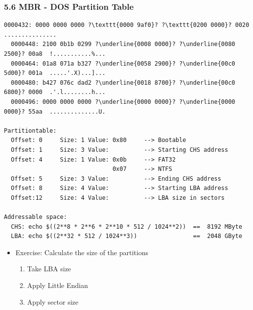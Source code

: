 \begin{frame}[fragile]
  \frametitle{5.6 MBR - DOS Partition Table}
  \begin{lstlisting}[basicstyle=\tiny,escapechar=\?]
  0000432: 0000 0000 0000 ?\texttt{0000 9af0}? ?\texttt{0200 0000}? 0020  ............... 
  0000448: 2100 0b1b 0299 ?\underline{0008 0000}? ?\underline{0080 2500}? 00a8  !...........%...
  0000464: 01a8 071a b327 ?\underline{0058 2900}? ?\underline{00c0 5d00}? 001a  .....'.X)...]...
  0000480: b427 076c dad2 ?\underline{0018 8700}? ?\underline{00c0 6800}? 0000  .'.l........h...
  0000496: 0000 0000 0000 ?\underline{0000 0000}? ?\underline{0000 0000}? 55aa  ..............U.

Partitiontable:
  Offset: 0     Size: 1	Value: 0x80     --> Bootable
  Offset: 1     Size: 3	Value:          --> Starting CHS address
  Offset: 4     Size: 1	Value: 0x0b     --> FAT32
                               0x07     --> NTFS
  Offset: 5     Size: 3	Value:          --> Ending CHS address
  Offset: 8     Size: 4 Value:          --> Starting LBA address
  Offset:12     Size: 4 Value:          --> LBA size in sectors
  
Addressable space:
  CHS: echo $((2**8 * 2**6 * 2**10 * 512 / 1024**2))  ==  8192 MByte
  LBA: echo $((2**32 * 512 / 1024**3))                ==  2048 GByte
  \end{lstlisting}
    \begin{itemize}
        \item Exercise: Calculate the size of the partitions
        \begin{enumerate}
            \item Take LBA size
	    \item Apply Little Endian
	    \item Apply sector size
        \end{enumerate}
    \end{itemize}
\end{frame}


